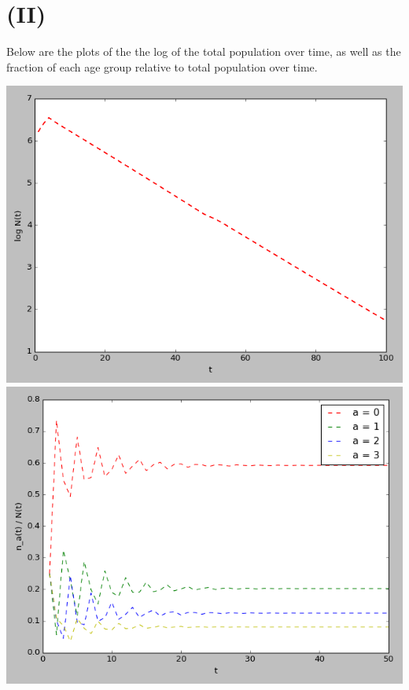 \documentclass{article}
\begin{document}
\section*{\textbf{(II)}}
Below are the plots of the the log of the total population over time, as well as the fraction of each age group relative to total population over time. 
\begin{center}
    \includegraphics[scale = .3]{part1_log_plot.png}
    \includegraphics[scale = .3]{part1_frac_plot.png}
\end{center}
\end{document}

